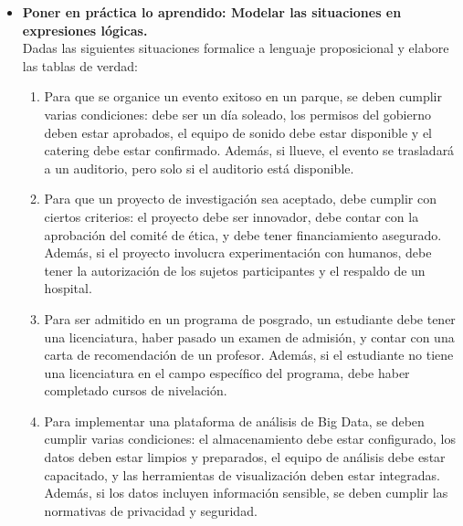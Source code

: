 \documentclass[12pt]{article}
\begin{document}
\begin{itemize}
\begin{enumerate}
                \end{enumerate}
            
            \newpage
            \item \textbf{ Poner en práctica lo aprendido: Modelar las situaciones en expresiones lógicas.}\\ Dadas las siguientes situaciones formalice a lenguaje proposicional y elabore las tablas de verdad: 
            
            \begin{enumerate}
                \item Para que se organice un evento exitoso en un parque, se deben cumplir varias condiciones: debe ser un día soleado, los permisos del gobierno deben estar aprobados, el equipo de sonido debe estar disponible y el catering debe estar confirmado. Además, si llueve, el evento se trasladará a un auditorio, pero solo si el auditorio está disponible.
                
                \item Para que un proyecto de investigación sea aceptado, debe cumplir con ciertos criterios: el proyecto debe ser innovador, debe contar con la aprobación del comité de ética, y debe tener financiamiento asegurado. Además, si el proyecto involucra experimentación con humanos, debe tener la autorización de los sujetos participantes y el respaldo de un hospital.
                
                \item Para ser admitido en un programa de posgrado, un estudiante debe tener una licenciatura, haber pasado un examen de admisión, y contar con una carta de recomendación de un profesor. Además, si el estudiante no tiene una licenciatura en el campo específico del programa, debe haber completado cursos de nivelación.
                
                \item Para implementar una plataforma de análisis de Big Data, se deben cumplir varias condiciones: el almacenamiento debe estar configurado, los datos deben estar limpios y preparados, el equipo de análisis debe estar capacitado, y las herramientas de visualización deben estar integradas. Además, si los datos incluyen información sensible, se deben cumplir las normativas de privacidad y seguridad.
                

\end{enumerate}
\end{itemize}
\end{document}
